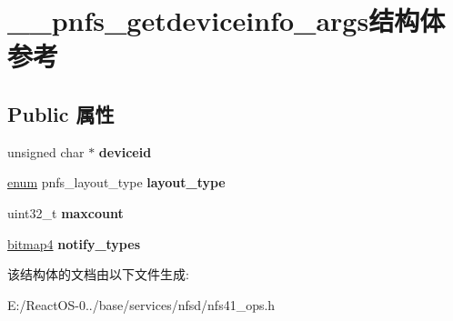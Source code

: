 \hypertarget{struct____pnfs__getdeviceinfo__args}{}\section{\+\_\+\+\_\+pnfs\+\_\+getdeviceinfo\+\_\+args结构体 参考}
\label{struct____pnfs__getdeviceinfo__args}
\subsection*{Public 属性}
\begin{DoxyCompactItemize}
\item 
\mbox{\label{struct____pnfs__getdeviceinfo__args_ac209e9e6a3058aa082f63df86f9663c1}} 
unsigned char $\ast$ {\bfseries deviceid}
\item 
\mbox{\label{struct____pnfs__getdeviceinfo__args_ab078c9fd2d85572e43d254c5edb14dc0}} 
\hyperlink{interfaceenum}{enum} pnfs\+\_\+layout\+\_\+type {\bfseries layout\+\_\+type}
\item 
\mbox{\label{struct____pnfs__getdeviceinfo__args_a3b0baff490e96495b0c11ec5c89e9af4}} 
uint32\+\_\+t {\bfseries maxcount}
\item 
\mbox{\label{struct____pnfs__getdeviceinfo__args_a488b8a8d6cca795688187b7af78e48cd}} 
\hyperlink{struct____bitmap4}{bitmap4} {\bfseries notify\+\_\+types}
\end{DoxyCompactItemize}


该结构体的文档由以下文件生成\+:\begin{DoxyCompactItemize}
\item 
E\+:/\+React\+O\+S-\/0../base/services/nfsd/nfs41\+\_\+ops.\+h\end{DoxyCompactItemize}
